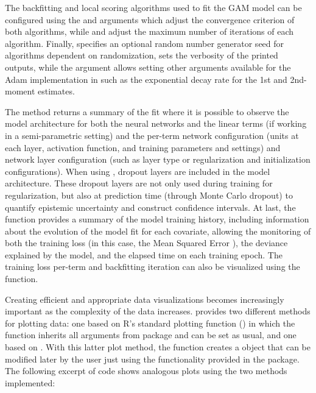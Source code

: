 The backfitting and local scoring algorithms used to fit the GAM model can be configured using the  and  arguments which adjust the convergence criterion of both algorithms, while  and  adjust the maximum number of iterations of each algorithm. Finally,  specifies an optional random number generator seed for algorithms dependent on randomization,  sets the verbosity of the printed outputs, while the \code{\ldots} argument allows setting other arguments available for the Adam implementation in  such as the exponential decay rate for the 1st and 2nd-moment estimates.

The  method returns a summary of the fit where it is possible to observe the model architecture for both the neural networks and the linear terms (if working in a semi-parametric setting) and the per-term network configuration (units at each layer, activation function, and training parameters and settings) and network layer configuration (such as layer type or regularization and initialization configurations). When using , dropout layers are included in the model architecture. These dropout layers are not only used during training for regularization, but also at prediction time (through Monte Carlo dropout) to quantify epistemic uncertainty and construct confidence intervals. At last, the  function provides a summary of the model training history, including information about the evolution of the model fit for each covariate, allowing the monitoring of both the training loss (in this case, the Mean Squared Error ), the deviance explained by the model, and the elapsed time on each training epoch. The training loss per-term and backfitting iteration can also be visualized using the  function.

Creating efficient and appropriate data visualizations becomes increasingly important as the complexity of the data increases.  provides two different methods for plotting data: one based on \textsf{R}'s standard plotting function () in which the  function inherits all arguments from  package and can be set as usual, and one based on   \citep{ggplot2}. With this latter plot method, the  function creates a  object that can be modified later by the user just using the functionality provided in the  package. The following excerpt of code shows analogous plots using the two methods implemented:

